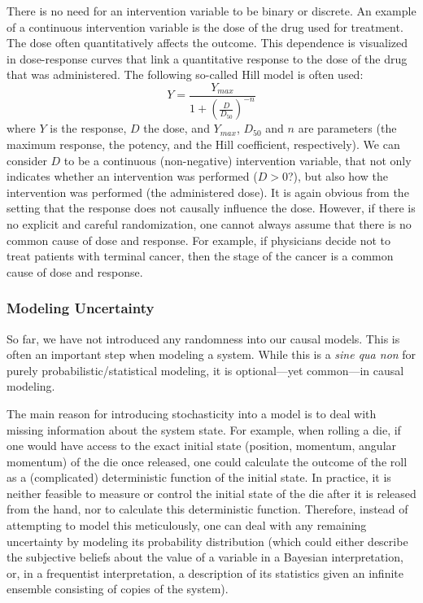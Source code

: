 There is no need for an intervention variable to be binary or discrete. An example of a continuous
intervention variable is the dose of the drug used for treatment. The dose often quantitatively
affects the outcome. This dependence is visualized in dose-response curves that link 
a quantitative response to the dose of the drug that was administered. 
The following so-called Hill model is often used:
$$Y = \frac{Y_{max}}{1 + \left(\frac{D}{D_{50}}\right)^{-n}}$$
where $Y$ is the response, $D$ the dose, and $Y_{max}$, $D_{50}$ and $n$ are parameters
(the maximum response, the potency, and the Hill coefficient, respectively).
We can consider $D$ to be a continuous (non-negative) intervention variable, that not only indicates
whether an intervention was performed ($D > 0$?), but also 
how the intervention was performed (the administered dose).
It is again obvious from the setting that the response does not causally influence the dose.
However, if there is no explicit and careful randomization, one cannot always assume that
there is no common cause of dose and response. For example, if physicians decide not to treat
patients with terminal cancer, then the stage of the cancer is a common cause of dose and response.


\subsubsection{Modeling Uncertainty}

So far, we have not introduced any randomness into our causal models. This is
often an important step when modeling a system. While this is a \emph{sine qua
non} for purely probabilistic/statistical modeling, it is optional---yet
common---in causal modeling. 

The main reason for introducing stochasticity into a model is to deal with
missing information about the system state. For example, when
rolling a die, if one would have access to the exact initial state (position, momentum,
angular momentum) of the die once released, one could calculate the outcome of the 
roll as a (complicated) deterministic function of the initial state. In
practice, it is neither feasible to measure or control the initial state of the die
after it is released from the hand, nor to calculate this deterministic function. 
Therefore, instead of attempting to model this
meticulously, one can deal with any remaining uncertainty by modeling its probability distribution
(which could either describe the subjective beliefs about the value of a variable
in a Bayesian interpretation, or, in a frequentist interpretation, a description of 
its statistics given an infinite ensemble consisting of copies of the system). 

